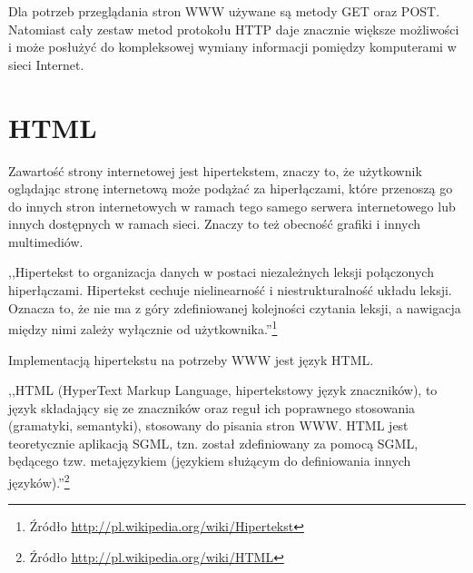 \documentclass[a4paper,12pt,oneside]{report}
\begin{document}
Dla potrzeb przeglądania stron WWW używane są metody GET oraz POST. Natomiast cały zestaw metod protokołu HTTP daje znacznie większe możliwości i może posłużyć do kompleksowej wymiany informacji pomiędzy komputerami w sieci Internet.

\section{HTML}
\label{sec:html}
Zawartość strony internetowej jest hipertekstem, znaczy to, że użytkownik oglądając stronę internetową może podążać za hiperłączami, które przenoszą go do innych stron internetowych w ramach tego samego serwera internetowego lub innych dostępnych w ramach sieci. Znaczy to też obecność grafiki i innych multimediów.

,,Hipertekst to organizacja danych w postaci niezależnych leksji połączonych hiperłączami. Hipertekst cechuje nielinearność i niestrukturalność układu leksji. Oznacza to, że nie ma z góry zdefiniowanej kolejności czytania leksji, a nawigacja między nimi zależy wyłącznie od użytkownika.''\footnote{Źródło \url{http://pl.wikipedia.org/wiki/Hipertekst}}

Implementacją hipertekstu na potrzeby WWW jest język HTML.

,,HTML (HyperText Markup Language, hipertekstowy język znaczników), to język składający się ze znaczników oraz reguł ich poprawnego stosowania (gramatyki, semantyki), stosowany do pisania stron WWW. HTML jest teoretycznie aplikacją SGML, tzn. został zdefiniowany za pomocą SGML, będącego tzw. metajęzykiem (językiem służącym do definiowania innych języków).''\footnote{Źródło \url{http://pl.wikipedia.org/wiki/HTML}}
\end{document}
